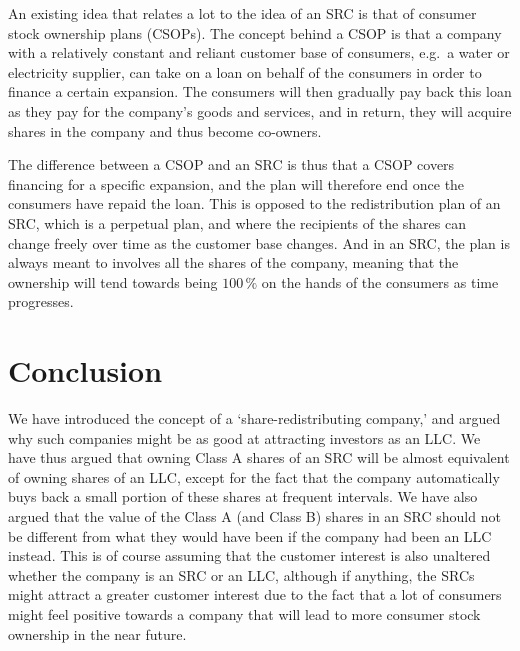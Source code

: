 \documentclass{article}
\begin{document}
An existing idea that relates a lot to the idea of an SRC is that of consumer stock ownership plans (CSOPs). 
The concept behind a CSOP is that a company with a relatively constant and reliant customer base of consumers, e.g.\ a water or electricity supplier, can take on a loan on behalf of the consumers in order to finance a certain expansion. The consumers will then gradually pay back this loan as they pay for the company's goods and services, and in return, they will acquire shares in the company and thus become co-owners. 

The difference between a CSOP and an SRC is thus that a CSOP covers financing for a specific expansion, and the plan will therefore end once the consumers have repaid the loan. This is opposed to the redistribution plan of an SRC, which is a perpetual plan, and where the recipients of the shares can change freely over time as the customer base changes. And in an SRC, the plan is always meant to involves all the shares of the company, meaning that the ownership will tend towards being $100\,\%$ on the hands of the consumers as time progresses. 



\section{Conclusion} 

We have introduced the concept of a `share-redistributing company,' and argued why such companies might be as good at attracting investors as an LLC. We have thus argued that owning Class A shares of an SRC will be almost equivalent of owning shares of an LLC, except for the fact that the company automatically buys back a small portion of these shares at frequent intervals. We have also argued that the value of the Class A (and Class B) shares in an SRC should not be different from what they would have been if the company had been an LLC instead. 
%
This is of course assuming that the customer interest is also unaltered whether the company is an SRC or an LLC, although if anything, the SRCs might attract a greater customer interest due to the fact that a lot of consumers might feel positive towards a company that will lead to more consumer stock ownership in the near future. 
\end{document}
